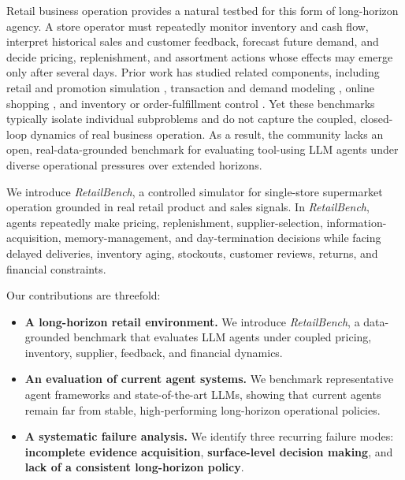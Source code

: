 Retail business operation provides a natural testbed for this form of long-horizon agency. A store operator must repeatedly monitor inventory and cash flow, interpret historical sales and customer feedback, forecast future demand, and decide pricing, replenishment, and assortment actions whose effects may emerge only after several days. Prior work has studied related components, including retail and promotion simulation \citep{xia2023retailsynth,xia2024simulationretailpromotions}, transaction and demand modeling \citep{wang2025freshretailnet,tkachuk2024consumertransactions}, online shopping \citep{wang2025shoppingbench,3webshopscalablerealworldweb}, and inventory or order-fulfillment control \citep{OFCOURSE,inventory,leluc2023marlimmultiagentreinforcementlearning,invagentlargelanguagemodel,aimbenchevaluatingdecisionmakingbiases}. Yet these benchmarks typically isolate individual subproblems and do not capture the coupled, closed-loop dynamics of real business operation. As a result, the community lacks an open, real-data-grounded benchmark for evaluating tool-using LLM agents under diverse operational pressures over extended horizons.

We introduce \textit{RetailBench}, a controlled simulator for single-store supermarket operation grounded in real retail product and sales signals. In \textit{RetailBench}, agents repeatedly make pricing, replenishment, supplier-selection, information-acquisition, memory-management, and day-termination decisions while facing delayed deliveries, inventory aging, stockouts, customer reviews, returns, and financial constraints.

Our contributions are threefold:
\begin{itemize}[leftmargin=*]
    \item \textbf{A long-horizon retail environment.} We introduce \textit{RetailBench}, a data-grounded benchmark that evaluates LLM agents under coupled pricing, inventory, supplier, feedback, and financial dynamics.
    \item \textbf{An evaluation of current agent systems.} We benchmark representative agent frameworks and state-of-the-art LLMs, showing that current agents remain far from stable, high-performing long-horizon operational policies.
    \item \textbf{A systematic failure analysis.} We identify three recurring failure modes: \textbf{incomplete evidence acquisition}, \textbf{surface-level decision making}, and \textbf{lack of a consistent long-horizon policy}.
\end{itemize}